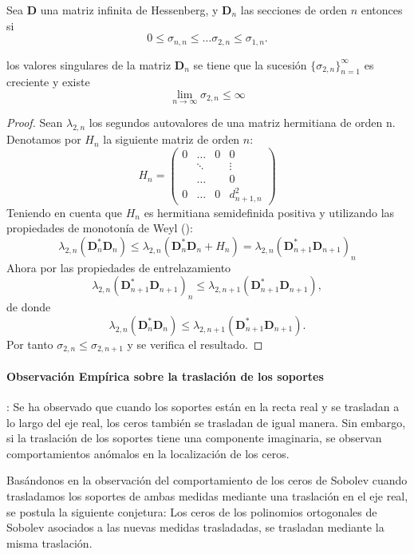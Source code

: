 \begin{proposition} Sea $\mathbf{D}$ una matriz infinita de Hessenberg, y $\mathbf{D}_n$ las secciones de orden $n$ entonces si $$
    0 \leq \sigma_{n,n}\leq \dots \sigma_{2,n} \leq \sigma_{1,n}.
  $$

  \noindent los valores singulares de la matriz $\mathbf{D}_n$ se tiene que
  la sucesión $\{\sigma_{2,n}\}_{n=1}^{\infty}$ es creciente y existe
  $$
    \lim_{n\to \infty} \sigma_{2,n} \leq \infty
  $$


\end{proposition}

\begin{proof}
  Sean $\lambda_{2,n}$ los segundos autovalores de una   matriz hermitiana de orden n. Denotamos por $H_n$  la siguiente matriz de orden $n$:
  \[
    H_n=\begin{pmatrix}
      0 & \ldots & 0 & 0           \\
        & \ddots &   & \vdots      \\
        & \dots  &   & 0           \\
      0 & \dots  & 0 & d_{n+1,n}^2
    \end{pmatrix}
  \]
  Teniendo en cuenta que $H_n$ es hermitiana semidefinida positiva y utilizando las propiedades de monotonía de Weyl (\cite{Bhatia1997}):
  \[
    \lambda_{2,n} (\mathbf{D}_n^{*}\mathbf{D}_n) \leq  \lambda_{2,n}(\mathbf{D}_n^{*}\mathbf{D}_n +H_n)=\lambda_{2,n}(
    \mathbf{D}_{n+1}^{*}\mathbf{D}_{n+1})_{n}   \]
  Ahora por las propiedades de entrelazamiento
  \[
    \lambda_{2,n}(
    \mathbf{D}_{n+1}^{*}\mathbf{D}_{n+1})_{n} \leq \lambda_{2,n+1}(
    \mathbf{D}_{n+1}^{*}\mathbf{D}_{n+1}), \]
  de donde
  \[
    \lambda_{2,n}(\mathbf{D}_n^{*}\mathbf{D}_n) \leq \lambda_{2,n+1}(
    \mathbf{D}_{n+1}^{*}\mathbf{D}_{n+1}). \] Por tanto $\sigma_{2,n}\leq\sigma_{2,n+1}$  y se verifica el resultado.
\end{proof}

\paragraph{Observación Empírica sobre la traslación de los soportes}: Se ha observado que cuando los soportes están en la recta real y se trasladan a lo largo del eje real, los ceros también se trasladan de igual manera. Sin embargo, si la traslación de los soportes tiene una componente imaginaria, se observan comportamientos anómalos en la localización de los ceros.

\begin{conjetura}
  Basándonos en la observación del comportamiento de los ceros de Sobolev cuando trasladamos los soportes de ambas medidas mediante una traslación en el eje real, se postula la siguiente conjetura:
  \label{conj:zeros_sobolev_translation}
  Los ceros de los polinomios ortogonales de Sobolev asociados a las nuevas medidas trasladadas, se trasladan mediante la misma traslación.
\end{conjetura}

